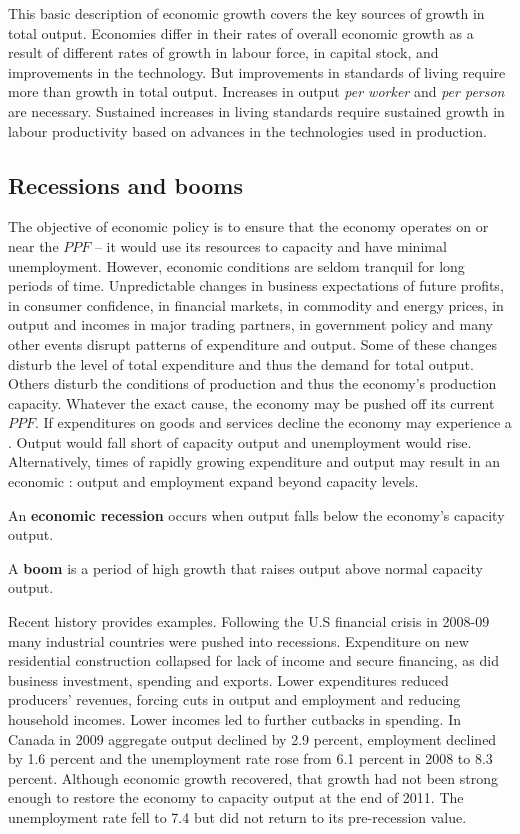

This basic description of economic growth covers the key sources of growth in total output. Economies differ in their rates of overall economic growth as a result of different rates of growth in labour force, in capital stock, and improvements in the technology. But improvements in standards of living require more than growth in total output. Increases in output \textit{per worker} and \textit{per person} are necessary.  Sustained increases in living standards require sustained growth in labour productivity based on advances in the technologies used in production. 

\subsection*{Recessions and booms}

The objective of economic policy is to ensure that the economy operates on or near the $PPF$ -- it would use its resources to capacity and have minimal unemployment. However, economic conditions are seldom tranquil for long periods of time. Unpredictable changes in business expectations of future profits, in consumer confidence, in financial markets, in commodity and energy prices, in output and incomes in major trading partners, in government policy and many other events disrupt patterns of expenditure and output. Some of these changes disturb the level of total expenditure and thus the demand for total output. Others disturb the conditions of production and thus the economy's production capacity. Whatever the exact cause, the economy may be pushed off its current $PPF$. If expenditures on goods and services decline the economy may experience a . Output would fall short of capacity output and unemployment would rise. Alternatively, times of rapidly growing expenditure and output may result in an economic : output and employment expand beyond capacity levels.

\begin{DefBox}
An \textbf{economic recession} occurs when output falls below the economy's capacity output.

A \textbf{boom} is a period of high growth that raises output above normal capacity output. 
\end{DefBox}

Recent history provides examples. Following the U.S financial crisis in 2008-09 many industrial countries were pushed into recessions. Expenditure on new residential construction collapsed for lack of income and secure financing, as did business investment, spending and exports. Lower expenditures reduced producers' revenues, forcing cuts in output and employment and reducing household incomes. Lower incomes led to further cutbacks in spending. In Canada in 2009 aggregate output declined by 2.9 percent, employment declined by 1.6 percent and the unemployment rate rose from 6.1 percent in 2008 to 8.3 percent. Although economic growth recovered, that growth had not been strong enough to restore the economy to capacity output at the end of 2011. The unemployment rate fell to 7.4 but did not return to its pre-recession value.  


